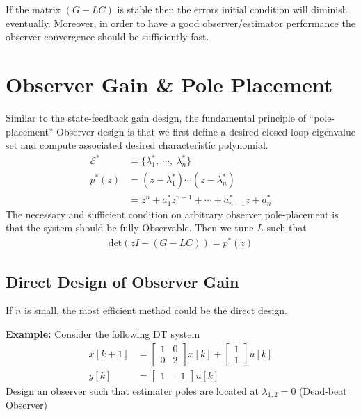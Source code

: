 \documentclass[twoside]{article}
\begin{document}
If the matrix $\left( G - L C \right)$ is stable then the errors
initial condition will diminish eventually. Moreover, in order
to have a good observer/estimator performance the observer
convergence should be sufficiently fast. 

\section*{Observer Gain \& Pole Placement}

Similar to the state-feedback gain design,
the fundamental principle of ``pole-placement'' Observer design is that
we first define a desired closed-loop eigenvalue set and 
compute associated desired characteristic polynomial. 
%
\begin{align*}
 \mathcal{E}^* &= \lbrace \lambda_1^* , \ \cdots, \  \lambda_n^*
                 \rbrace
  \\
  p^*(z) &= \left( z - \lambda_1^* \right) \cdots \left( z - \lambda_n^*
         \right)                         
  \\
  &= z^n + a_1^* z^{n-1} + \cdots + a_{n-1}^* z + a_n^*
\end{align*}
%
The necessary and sufficient condition on arbitrary observer pole-placement
is that the system should be fully Observable. Then we tune $L$ such
that 
%
\begin{align*}
  \mathrm{det} \left( z I - ( G - L C ) \right) = p^*(z)
\end{align*}
%
\subsection*{Direct Design of Observer Gain}

If $n$ is small, the most efficient method could be the direct
design. 

\textbf{Example:} Consider the following DT system
%
\begin{align*}
 x[k+1] &= \left[ \begin{array}{cc} 1 & 0 \\ 0 & 2 \end{array} \right] x[k]
    + \left[ \begin{array}{c} 1 \\ 1 \end{array} \right] u[k]
\\
 y[k] &= \left[ \begin{array}{cc} 1 & -1 \end{array} \right] u[k]
\end{align*}
% 
Design an observer such that estimater poles are located at 
$\lambda_{1,2} = 0$ (Dead-beat Observer)
\end{document}
